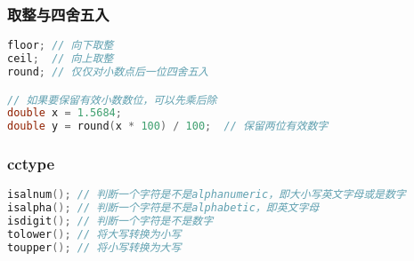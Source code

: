 \documentclass[UTF8]{ctexart}
\begin{document}
\subsubsection*{取整与四舍五入}
\begin{lstlisting}[language=C++]
floor; // 向下取整
ceil;  // 向上取整
round; // 仅仅对小数点后一位四舍五入

// 如果要保留有效小数数位，可以先乘后除
double x = 1.5684;
double y = round(x * 100) / 100;  // 保留两位有效数字
\end{lstlisting}

\subsubsection*{cctype}
\begin{lstlisting}[language=C++]
isalnum(); // 判断一个字符是不是alphanumeric，即大小写英文字母或是数字
isalpha(); // 判断一个字符是不是alphabetic，即英文字母
isdigit(); // 判断一个字符是不是数字
tolower(); // 将大写转换为小写
toupper(); // 将小写转换为大写
\end{lstlisting}
\end{document}

